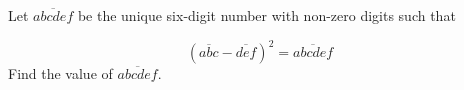 Let $\overline{abcdef}$ be the unique six-digit number with non-zero digits such that

$$\left(\overline{abc}-\overline{def}\right)^2=\overline{abcdef}$$Find the value of $\overline{abcdef}$.
